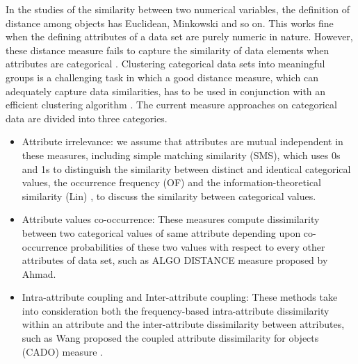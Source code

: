 \documentclass[review]{elsarticle}
\begin{document}
In the studies of the similarity between two numerical variables, the definition of distance among objects has Euclidean, Minkowski and so on. This works fine when the defining attributes of a data set are purely numeric in nature. However, these distance measure fails to capture the similarity of data elements when attributes are categorical \cite{Ahmad2007KMean}. Clustering categorical data sets into meaningful groups is a challenging task in which a good distance measure, which can adequately capture data similarities, has to be used in conjunction with an efficient clustering algorithm \cite{Ahmad2007KMean}. The current measure approaches on categorical data are divided into three categories.
\begin{itemize}
  \item Attribute irrelevance: we assume that attributes are mutual independent in these measures, including simple matching similarity (SMS), which uses 0s and 1s to distinguish the similarity between distinct and identical categorical values, the occurrence frequency (OF) \cite{Boriah2008Similarity} and the information-theoretical similarity (Lin) \cite{Boriah2008Similarity}, to discuss the similarity between categorical values.
  \item Attribute values co-occurrence: These measures compute dissimilarity between two categorical values of same attribute depending upon co-occurrence probabilities of these two values with respect to every other attributes of data set, such as ALGO DISTANCE measure \cite{Ahmad2007Method} proposed by Ahmad.
  \item Intra-attribute coupling and Inter-attribute coupling: These methods take into consideration both the frequency-based intra-attribute dissimilarity within an attribute and the inter-attribute dissimilarity between attributes, such as Wang proposed the coupled attribute dissimilarity for objects (CADO) measure \cite{Wang2015Coupled}.
 \end{itemize}
\end{document}
